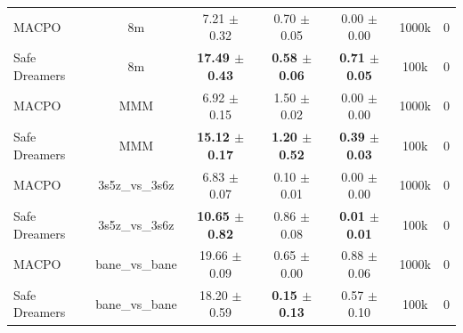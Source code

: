 \begin{longtable}{lcccccc}
\midrule
MACPO & 8m & 7.21 $\pm$ 0.32 & 0.70 $\pm$ 0.05 & 0.00 $\pm$ 0.00 & 1000k & 0 \\
Safe Dreamers & 8m & \textbf{17.49 $\pm$ 0.43} & \textbf{0.58 $\pm$ 0.06} & \textbf{0.71 $\pm$ 0.05} & 100k & 0 \\
\midrule
MACPO & MMM & 6.92 $\pm$ 0.15 & 1.50 $\pm$ 0.02 & 0.00 $\pm$ 0.00 & 1000k & 0 \\
Safe Dreamers & MMM & \textbf{15.12 $\pm$ 0.17} & \textbf{1.20 $\pm$ 0.52} & \textbf{0.39 $\pm$ 0.03} & 100k & 0 \\
\midrule
MACPO & 3s5z\_vs\_3s6z & 6.83 $\pm$ 0.07 & 0.10 $\pm$ 0.01 & 0.00 $\pm$ 0.00 & 1000k & 0 \\
Safe Dreamers & 3s5z\_vs\_3s6z & \textbf{10.65 $\pm$ 0.82} & 0.86 $\pm$ 0.08 & \textbf{0.01 $\pm$ 0.01} & 100k & 0 \\
\midrule
MACPO & bane\_vs\_bane & 19.66 $\pm$ 0.09 & 0.65 $\pm$ 0.00 & 0.88 $\pm$ 0.06 & 1000k & 0 \\
Safe Dreamers & bane\_vs\_bane & 18.20 $\pm$ 0.59 & \textbf{0.15 $\pm$ 0.13} & 0.57 $\pm$ 0.10 & 100k & 0 \\
\end{longtable}
